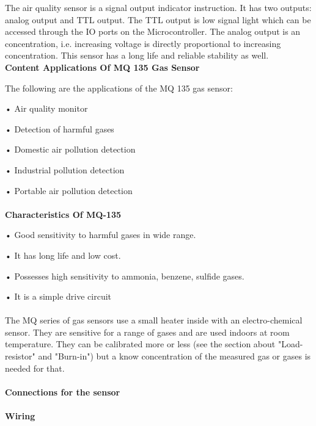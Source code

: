 \documentclass[11pt]{report}
\begin{document}
	The air quality sensor is a signal output indicator instruction. It has two outputs: analog output and TTL output. The TTL output is low signal light which can be accessed through the IO ports on the Microcontroller. The analog output is an concentration, i.e. increasing voltage is directly proportional to increasing concentration. This sensor has a long life and reliable stability as well.\\
	
	\textbf{Content Applications Of MQ 135 Gas Sensor}
	
	The following are the applications of the MQ 135 gas sensor:
	
	•	Air quality monitor
	
	•	Detection of harmful gases
	
	•	Domestic air pollution detection
	
	•	Industrial pollution detection
	
	•	Portable air pollution detection\\\\
	
	\textbf{	Characteristics Of MQ-135}
	
	•	Good sensitivity to harmful gases in wide range.
	
	•	It has long life and low cost.
	
	•	Possesses high sensitivity to ammonia, benzene, sulfide gases.
	
	•	It is a simple drive circuit\\\\
	
	The MQ series of gas sensors use a small heater inside with an electro-chemical sensor. They are sensitive for a range of gases and are used indoors at room temperature.
	They can be calibrated more or less (see the section about "Load-resistor" and "Burn-in") but a know concentration of the measured gas or gases is needed for that.
	\\\\
	\textbf{Connections for the sensor}
	\\\\
	\textbf{Wiring}
	
\end{document}
